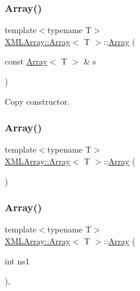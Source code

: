 \subsubsection{\texorpdfstring{Array()}{Array()}\hspace{0.1cm}{\footnotesize\ttfamily [6/9]}}
{\footnotesize\ttfamily template$<$typename T$>$ \\
\mbox{\hyperlink{classXMLArray_1_1Array}{X\+M\+L\+Array\+::\+Array}}$<$ T $>$\+::\mbox{\hyperlink{classXMLArray_1_1Array}{Array}} (\begin{DoxyParamCaption}\item[{const \mbox{\hyperlink{classXMLArray_1_1Array}{Array}}$<$ T $>$ \&}]{s }\end{DoxyParamCaption})\hspace{0.3cm}{\ttfamily [inline]}}



Copy constructor. 

\mbox{\label{classXMLArray_1_1Array_a5b81635bef141ec21cbb11a4ae235aff}} 
\subsubsection{\texorpdfstring{Array()}{Array()}\hspace{0.1cm}{\footnotesize\ttfamily [7/9]}}
{\footnotesize\ttfamily template$<$typename T$>$ \\
\mbox{\hyperlink{classXMLArray_1_1Array}{X\+M\+L\+Array\+::\+Array}}$<$ T $>$\+::\mbox{\hyperlink{classXMLArray_1_1Array}{Array}} (\begin{DoxyParamCaption}{ }\end{DoxyParamCaption})\hspace{0.3cm}{\ttfamily [inline]}}

\mbox{\label{classXMLArray_1_1Array_ae2ff376197c96aa965c9b04297b013cd}} 
\subsubsection{\texorpdfstring{Array()}{Array()}\hspace{0.1cm}{\footnotesize\ttfamily [8/9]}}
{\footnotesize\ttfamily template$<$typename T$>$ \\
\mbox{\hyperlink{classXMLArray_1_1Array}{X\+M\+L\+Array\+::\+Array}}$<$ T $>$\+::\mbox{\hyperlink{classXMLArray_1_1Array}{Array}} (\begin{DoxyParamCaption}\item[{int}]{ns1 }\end{DoxyParamCaption})\hspace{0.3cm}{\ttfamily [inline]}, {\ttfamily [explicit]}}

